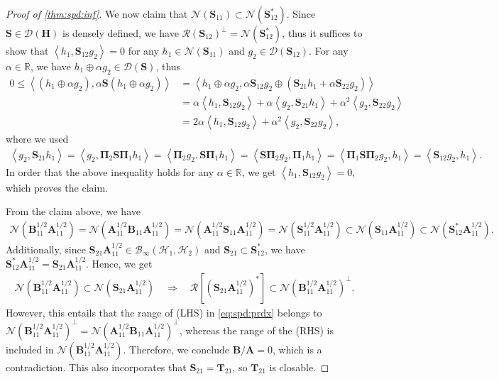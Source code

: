 \documentclass[noinfoline]{imsart}\setcounter{tocdepth}{2}
\renewcommand{\b}[1]{\mathbb{#1}} %
\newcommand{\m}[1]{\mathbf{#1}} %
\renewcommand{\c}[1]{\mathcal{#1}} %
\newcommand{\innpr}[2]{{\left\langle {#1},{#2}\right\rangle}} %
\theoremstyle{plain}
\begin{document}
\begin{proof}[Proof of \cref{thm:spd:inf}]
We now claim that $\c{N}(\m{S}_{11}) \subset \c{N}(\m{S}_{12}^{*})$. Since $\m{S} \in \c{D}(\m{H})$ is densely defined, we have $\c{R}(\m{S}_{12})^{\perp} = \c{N}(\m{S}_{12}^{*})$, thus it suffices to show that $\innpr{h_{1}}{\m{S}_{12} g_{2}} = 0$ for any $h_{1} \in \c{N}(\m{S}_{11})$ and $g_{2} \in \c{D}(\m{S}_{12})$. For any $\alpha \in \b{R}$, we have $h_{1} \oplus \alpha g_{2} \in \c{D}(\m{S})$, thus
\begin{align*}
    0 \le \innpr{(h_{1} \oplus \alpha g_{2})}{\alpha \m{S} (h_{1} \oplus \alpha g_{2})} 
    &= \innpr{h_{1} \oplus \alpha g_{2}}{\alpha \m{S}_{12} g_{2} \oplus (\m{S}_{21} h_{1} + \alpha \m{S}_{22} g_{2})} \\
    &= \alpha \innpr{h_{1}}{\m{S}_{12} g_{2}} + \alpha \innpr{g_{2}}{\m{S}_{21} h_{1}} + \alpha^{2} \innpr{g_{2}}{\m{S}_{22} g_{2}} \\
    &= 2\alpha \innpr{h_{1}}{\m{S}_{12} g_{2}} + \alpha^{2} \innpr{g_{2}}{\m{S}_{22} g_{2}},
\end{align*}
where we used
\begin{align*}
    \innpr{g_{2}}{\m{S}_{21} h_{1}} = \innpr{g_{2}}{\m{\Pi}_{2} \m{S} \m{\Pi}_{1} h_{1}} = \innpr{\m{\Pi}_{2}  g_{2}}{\m{S} \m{\Pi}_{1} h_{1}} = \innpr{\m{S} \m{\Pi}_{2}  g_{2}}{ \m{\Pi}_{1} h_{1}} = \innpr{\m{\Pi}_{1}  \m{S} \m{\Pi}_{2}  g_{2}}{ h_{1}} = \innpr{\m{S}_{12} g_{2}}{h_{1}}.
\end{align*}
In order that the above inequality holds for any $\alpha \in \b{R}$, we get $\innpr{h_{1}}{\m{S}_{12} g_{2}} = 0$, which proves the claim. 

From the claim above, we have
\begin{align*}
    \c{N}(\m{B}_{11}^{1/2} \m{A}_{11}^{1/2}) = \c{N}(\m{A}_{11}^{1/2} \m{B}_{11} \m{A}_{11}^{1/2}) = \c{N} (\m{A}_{11}^{1/2} \m{S}_{11} \m{A}_{11}^{1/2}) = \c{N}(\m{S}_{11}^{1/2} \m{A}_{11}^{1/2}) 
    \subset \c{N}(\m{S}_{11} \m{A}_{11}^{1/2}) \subset \c{N}(\m{S}_{12}^{*} \m{A}_{11}^{1/2}).
\end{align*}
Additionally, since $\m{S}_{21} \m{A}_{11}^{1/2} \in \c{B}_{\infty}(\c{H}_{1}, \c{H}_{2})$ and $\m{S}_{21} \subset \m{S}_{12}^{*}$, we have $\m{S}_{12}^{*} \m{A}_{11}^{1/2} = \m{S}_{21} \m{A}_{11}^{1/2}$. Hence, we get
\begin{align*}
    \c{N}(\m{B}_{11}^{1/2} \m{A}_{11}^{1/2}) \subset \c{N}(\m{S}_{21} \m{A}_{11}^{1/2}) \quad \Rightarrow \quad \c{R}[(\m{S}_{21} \m{A}_{11}^{1/2})^{*}] \subset \c{N}(\m{B}_{11}^{1/2} \m{A}_{11}^{1/2})^{\perp}.
\end{align*}
However, this entails that the range of (LHS) in \eqref{eq:spd:prdx} belongs to $\c{N}(\m{B}_{11}^{1/2} \m{A}_{11}^{1/2})^{\perp} = \c{N}(\m{A}_{11}^{1/2} \m{B}_{11} \m{A}_{11}^{1/2})^{\perp}$, whereas the range of the (RHS) is included in $\c{N}(\m{B}_{11}^{1/2} \m{A}_{11}^{1/2})$. Therefore, we conclude $\m{B}/\m{A} =0$, which is a contradiction. This also incorporates that $\m{S}_{21} = \m{T}_{21}$, so $\m{T}_{21}$ is closable.
\end{proof}
\end{document}
